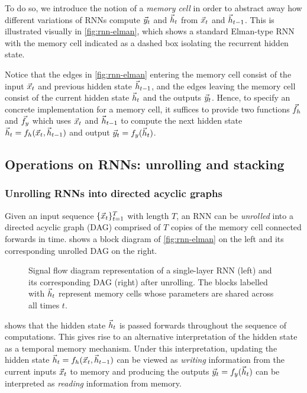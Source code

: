 To do so, we introduce the notion of a \emph{memory cell} in order to abstract
away how different variations of RNNs compute $\vec{y}_t$ and $\vec{h}_t$ from $\vec{x}_t$ and
$\vec{h}_{t-1}$. This is illustrated visually in \cref{fig:rnn-elman}, which shows a
standard Elman-type RNN \citep{elman1990finding} with the memory cell indicated
as a dashed box isolating the recurrent hidden state.

Notice that the edges in \cref{fig:rnn-elman} entering the memory cell
consist of the input $\vec{x}_t$ and previous hidden state $\vec{h}_{t-1}$,
and the edges leaving the memory cell consist of the current hidden state $\vec{h}_t$
and the outputs $\vec{y}_t$. Hence, to specify an concrete implementation for a
memory cell, it suffices to provide two functions $\vec{f}_h$ and $\vec{f}_y$ which
uses $\vec{x}_t$ and $\vec{h}_{t-1}$ to compute the next hidden state $\vec{h}_t = f_h(\vec{x}_t,
\vec{h}_{t-1})$ and output $\vec{y}_t = f_y(\vec{h}_t)$.

\subsection{Operations on RNNs: unrolling and stacking}

\subsubsection{Unrolling RNNs into directed acyclic graphs}


Given an input sequence $\{\vec{x}_{t}\}_{t=1}^T$ with length $T$, an RNN can be
\emph{unrolled} into a directed acyclic graph (DAG) comprised of $T$ copies of the
memory cell connected forwards in time.  shows
a block diagram of \cref{fig:rnn-elman} on the left and its corresponding unrolled
DAG on the right.

\begin{figure}[tb]
  \centering
  \resizebox{4.5in}{!}{}
  \caption{Signal flow diagram representation of a single-layer RNN (left) and its
    corresponding DAG (right) after unrolling. The blocks labelled
    with $\vec{h}_t$ represent memory cells whose parameters are shared across all times
  $t$.}
  \label{fig:rnn-single-unrolled}
\end{figure}

 shows that the hidden state $\vec{h}_t$ is passed
forwards throughout the sequence of computations. This gives rise to an
alternative interpretation of the hidden state as a temporal memory mechanism.
Under this interpretation, updating the hidden state $\vec{h}_t = f_h (\vec{x}_t,
\vec{h}_{t-1})$ can be viewed as \emph{writing} information from the current inputs
$\vec{x}_t$ to memory and producing the outputs $\vec{y}_t = f_y (\vec{h}_t)$ can be
interpreted as \emph{reading} information from memory.

